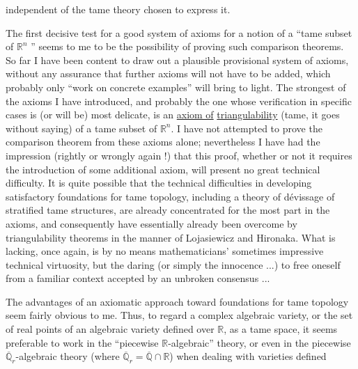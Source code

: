 
independent of the tame theory chosen to express
it.

The first decisive test for a good system of axioms
for a notion of a ``tame subset of $\mathbb{R}^n$ '' seems to me to be the possibility
of proving such comparison theorems. So far I have
been content to draw out a plausible provisional system of axioms,
without any assurance that further axioms will not have to be
added, which probably only ``work on concrete examples''
will bring to light. The strongest of the axioms I have
introduced, and probably the one whose verification in specific
cases is (or will be) most delicate, is an \uline{axiom of}
\uline{triangulability} (tame, it goes without saying) of a tame subset of $\mathbb{R}^n$.
I have not attempted to prove the comparison theorem from these axioms
alone; nevertheless I have had the impression (rightly
or wrongly again !) that this proof, whether or not it requires
the introduction of some additional axiom, will present
no great technical difficulty. It is quite possible
that the technical difficulties in developing
satisfactory foundations for tame topology, including a
theory of dévissage of stratified tame structures, are
already concentrated for the most part in the axioms, and consequently
have essentially already been overcome by triangulability
theorems in the manner of Lojasiewicz and Hironaka. What is lacking,
once again, is by no means mathematicians' sometimes impressive
technical virtuosity, but the daring (or simply
the innocence ...) to free oneself from a familiar context
accepted by an unbroken consensus ...

The advantages of an axiomatic approach toward foundations
for tame topology seem fairly obvious to me. Thus,
to regard a complex algebraic variety, or the set of
real points of an algebraic variety defined over $\mathbb{R}$, as a
tame space, it seems preferable to work in the
``piecewise $\mathbb{R}$-algebraic'' theory, or even in the piecewise $\overline{\mathbb{Q}}_r$-algebraic
theory (where $\overline{\mathbb{Q}}_r = \overline{\mathbb{Q}} \cap \mathbb{R}$) when dealing with varieties defined


